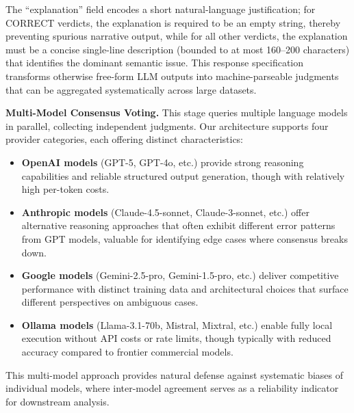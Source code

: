 \documentclass[print]{einformatica}
\begin{document}
The ``explanation'' field encodes a short natural-language justification; for CORRECT verdicts, the explanation is required to be an empty string, thereby preventing spurious narrative output, while for all other verdicts, the explanation must be a concise single-line description (bounded to at most 160--200 characters) that identifies the dominant semantic issue. This response specification transforms otherwise free-form LLM outputs into machine-parseable judgments that can be aggregated systematically across large datasets.

\textbf{Multi-Model Consensus Voting.} This stage queries multiple language models in parallel, collecting independent judgments. Our architecture supports four provider categories, each offering distinct characteristics:

\begin{itemize}
\item \textbf{OpenAI models} (GPT-5, GPT-4o, etc.) provide strong reasoning capabilities and reliable structured output generation, though with relatively high per-token costs.
\item \textbf{Anthropic models} (Claude-4.5-sonnet, Claude-3-sonnet, etc.) offer alternative reasoning approaches that often exhibit different error patterns from GPT models, valuable for identifying edge cases where consensus breaks down.
\item \textbf{Google models} (Gemini-2.5-pro, Gemini-1.5-pro, etc.) deliver competitive performance with distinct training data and architectural choices that surface different perspectives on ambiguous cases.
\item \textbf{Ollama models} (Llama-3.1-70b, Mistral, Mixtral, etc.) enable fully local execution without API costs or rate limits, though typically with reduced accuracy compared to frontier commercial models.
\end{itemize}

This multi-model approach provides natural defense against systematic biases of individual models, where inter-model agreement serves as a reliability indicator for downstream analysis.
\end{document}
